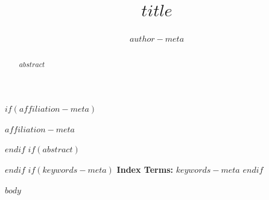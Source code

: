 \documentclass[$classoptions$]{IEEEtran}
\title{$title$}
\author{$author-meta$}
\date{}
\begin{document}
\maketitle
$if(affiliation-meta)$
\begin{center}
$affiliation-meta$
\end{center}
$endif$
$if(abstract)$
\begin{abstract}
$abstract$
\end{abstract}
$endif$
$if(keywords-meta)$
\noindent\textbf{Index Terms:} $keywords-meta$
$endif$

$body$
\end{document}
